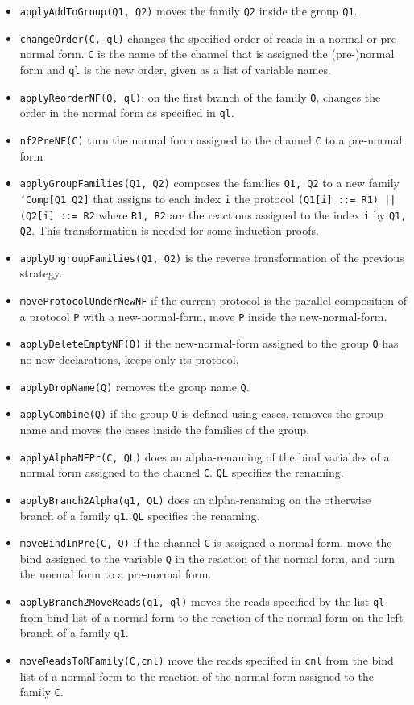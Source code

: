 \begin{itemize}
\item \texttt{applyAddToGroup(Q1, Q2)} moves the family 
\texttt{Q2} inside the group \texttt{Q1}.
\item \texttt{changeOrder(C, ql)} changes the specified order
of reads in a normal or pre-normal form. \texttt{C} is the name of 
the channel that is assigned the (pre-)normal form and
\texttt{ql} is the new order, given as a list of variable names.
\item \texttt{applyReorderNF(Q, ql)}: on the first branch of the family
\texttt{Q}, changes the order in the normal form as specified in 
\texttt{ql}.
\item \texttt{nf2PreNF(C)} turn the normal form assigned to the 
channel \texttt{C} to a pre-normal form
\item \texttt{applyGroupFamilies(Q1, Q2)} composes the families 
\texttt{Q1, Q2} to a new family \texttt{'Comp[Q1 Q2]} that assigns to
each index \texttt{i} the protocol
\texttt{(Q1[i] ::= R1) || (Q2[i] ::= R2} where \texttt{R1, R2} are
the reactions assigned to the index \texttt{i} by \texttt{Q1, Q2}.
This transformation is needed for some induction proofs.
\item \texttt{applyUngroupFamilies(Q1, Q2)} is the reverse transformation
of the previous strategy.
\item \texttt{moveProtocolUnderNewNF} if the current protocol is the parallel composition of a protocol \texttt{P} with a new-normal-form, move
\texttt{P} inside the new-normal-form.
\item \texttt{applyDeleteEmptyNF(Q)} if the new-normal-form assigned to the
group \texttt{Q} has no new declarations, keeps only its protocol.
\item \texttt{applyDropName(Q)} removes the group name \texttt{Q}.
\item \texttt{applyCombine(Q)} if the group \texttt{Q} is defined using cases, removes the group name and moves the cases inside the families of the group.
\item \texttt{applyAlphaNFPr(C, QL)} does an alpha-renaming of the bind
variables of a normal form assigned to the channel \texttt{C}.
 \texttt{QL} specifies the
renaming.
\item \texttt{applyBranch2Alpha(q1, QL)} does an alpha-renaming on the otherwise branch of a family \texttt{q1}. \texttt{QL} specifies the
renaming.
\item \texttt{moveBindInPre(C, Q)} if the channel \texttt{C} is assigned
a normal form, move the bind assigned to the variable \texttt{Q} in the
reaction of the normal form, and turn the normal form to a pre-normal form.
\item \texttt{applyBranch2MoveReads(q1, ql)} moves the reads 
specified by the list \texttt{ql} from bind list of a normal form to the reaction of the normal form on the left branch of a family 
\texttt{q1}.
\item \texttt{moveReadsToRFamily(C,cnl)} move the reads specified in \texttt{cnl} from the bind list of a normal form to the reaction of the normal form assigned to the family \texttt{C}.

\end{itemize}  

